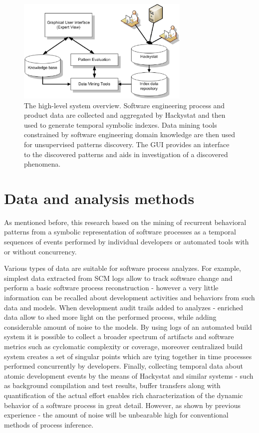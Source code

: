 \documentclass{sig-alternate}
\begin{document}
\begin{figure}[tbp]
   \centering
   \includegraphics[height=50mm]{system_overview.eps}
   \caption{The high-level system overview. Software engineering process and product data are collected and aggregated by Hackystat and then used to generate temporal symbolic indexes. Data mining tools constrained by software engineering domain knowledge are then used for unsupervised patterns discovery. The GUI provides an interface to the discovered patterns and aids in investigation of a discovered phenomena.}
   \label{fig:system_overview}
\end{figure}
 
\section{Data and analysis methods}
As mentioned before, this research based on the mining of recurrent behavioral patterns from a symbolic representation of software processes as a temporal sequences of events performed by individual developers or automated tools with or without concurrency. 

Various types of data are suitable for software process analyzes. For example, simplest data extracted from SCM logs allow to track software change and perform a basic software process reconstruction - however a very little information can be recalled about development activities and behaviors from such data and models. When development audit trails added to analyzes - enriched data allow to shed more light on the performed process, while adding considerable amount of noise to the models. By using logs of an automated build system it is possible to collect a broader spectrum of artifacts and software metrics such as cyclomatic complexity or coverage, moreover centralized build system creates a set of singular points which are tying together in time processes performed concurrently by developers. Finally, collecting temporal data about atomic development events by the means of Hackystat and similar systems - such as background compilation and test results, buffer transfers along with quantification of the actual effort enables rich characterization of the dynamic behavior of a software process in great detail. However, as shown by previous experience - the amount of noise will be unbearable high for conventional methods of process inference.
\end{document}
